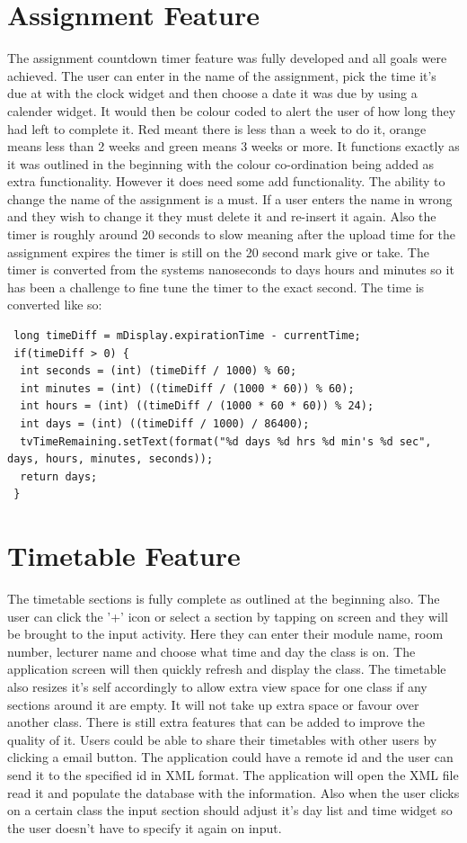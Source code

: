 \section{Assignment Feature}
The assignment countdown timer feature was fully developed and all goals were achieved. The user can enter in the name of the assignment, pick the time it's due at with the clock widget and then choose a date it was due by using a calender widget. It would then be colour coded to alert the user of how long they had left to complete it. Red meant there is less than a week to do it, orange means less than 2 weeks and green means 3 weeks or more. It functions exactly as it was outlined in the beginning with the colour co-ordination being added as extra functionality. However it does need some add functionality. The ability to change the name of the assignment is a must. If a user enters the name in wrong and they wish to change it they must delete it and re-insert it again. Also the timer is roughly around 20 seconds to slow meaning after the upload time for the assignment expires the timer is still on the 20 second mark give or take. The timer is converted from the systems nanoseconds to days hours and minutes so it has been a challenge to fine tune the timer to the exact second. The time is converted like so:
\begin{verbatim}
 long timeDiff = mDisplay.expirationTime - currentTime;
 if(timeDiff > 0) {
  int seconds = (int) (timeDiff / 1000) % 60;
  int minutes = (int) ((timeDiff / (1000 * 60)) % 60);
  int hours = (int) ((timeDiff / (1000 * 60 * 60)) % 24);
  int days = (int) ((timeDiff / 1000) / 86400);
  tvTimeRemaining.setText(format("%d days %d hrs %d min's %d sec", days, hours, minutes, seconds));
  return days;
 }
\end{verbatim}

\section{Timetable Feature}
The timetable sections is fully complete as outlined at the beginning also. The user can click the '+' icon or select a section by tapping on screen and they will be brought to the input activity. Here they can enter their module name, room number, lecturer name and choose what time and day the class is on. The application screen will then quickly refresh and display the class. The timetable also resizes it's self accordingly to allow extra view space for one class if any sections around it are empty. It will not take up extra space or favour over another class. There is still extra features that can be added to improve the quality of it. Users could be able to share their timetables with other users by clicking a email button. The application could have a remote id and the user can send it to the specified id in XML format. The application will open the XML file read it and populate the database with the information. Also when the user clicks on a certain class the input section should adjust it's day list and time widget so the user doesn't have to specify it again on input.

